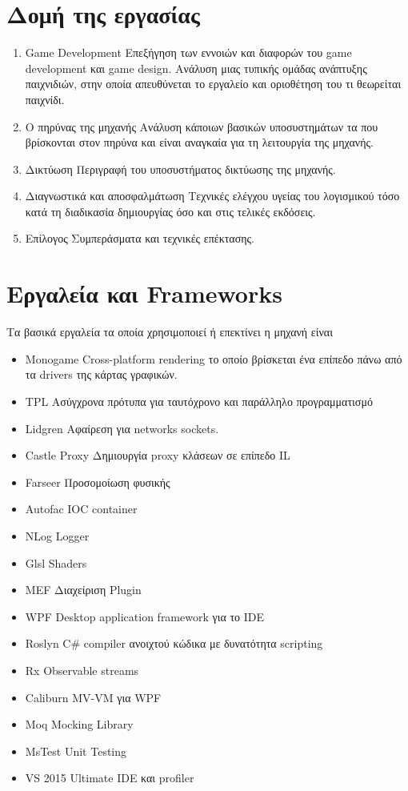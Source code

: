 \section{Δομή της εργασίας}
\begin{enumerate}
	\item{Game Development} Επεξήγηση των εννοιών και διαφορών του game development και game design. Ανάλυση μιας τυπικής ομάδας ανάπτυξης παιχνιδιών, στην οποία απευθύνεται το εργαλείο και οριοθέτηση του τι θεωρείται παιχνίδι.
	\item{Ο πηρύνας της μηχανής} Ανάλυση κάποιων βασικών υποσυστημάτων τα που βρίσκονται στον πηρύνα και είναι αναγκαία για τη λειτουργία της μηχανής.
	\item{Δικτύωση} Περιγραφή του υποσυστήματος δικτύωσης της μηχανής.
	\item{Διαγνωστικά και αποσφαλμάτωση} Τεχνικές ελέγχου υγείας του λογισμικού τόσο κατά τη διαδικασία δημιουργίας όσο και στις τελικές εκδόσεις.
	\item{Επίλογος} Συμπεράσματα και τεχνικές επέκτασης.
\end{enumerate}
\section{Εργαλεία και Frameworks}
Τα βασικά εργαλεία τα οποία χρησιμοποιεί ή επεκτίνει η μηχανή είναι
\begin{itemize}
	\item{Monogame} Cross-platform rendering το οποίο βρίσκεται ένα επίπεδο πάνω από τα drivers της κάρτας γραφικών.
	\item{TPL} Ασύγχρονα πρότυπα για ταυτόχρονο και παράλληλο προγραμματισμό 
	\item{Lidgren} Αφαίρεση για networks sockets. 
	\item{Castle Proxy} Δημιουργία proxy κλάσεων σε επίπεδο IL
	\item{Farseer} Προσομοίωση φυσικής
	\item{Autofac} IOC container
	\item{NLog} Logger
	\item{Glsl} Shaders
	\item{MEF} Διαχείριση Plugin
	\item{WPF} Desktop application framework για το IDE
	\item{Roslyn} C\# compiler ανοιχτού κώδικα με δυνατότητα scripting
	\item{Rx} Observable streams 
	\item{Caliburn} MV-VM για WPF
	\item{Moq} Mocking Library
	\item{MsTest} Unit Testing 
	\item{VS 2015 Ultimate} IDE και profiler
\end{itemize}


